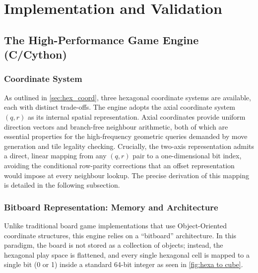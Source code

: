 \chapter{Implementation and Validation}
\label{chapter3}
\section{The High-Performance Game Engine (C/Cython)} \label{bitboard}

\subsection{Coordinate System}\label{sec:coord_system}

As outlined in \cref{sec:hex_coord}, three hexagonal coordinate systems are available, each with distinct trade-offs. The engine adopts the axial coordinate system $(q, r)$ as its internal spatial representation. Axial coordinates provide uniform direction vectors and branch-free neighbour arithmetic, both of which are essential properties for the high-frequency geometric queries demanded by move generation and tile legality checking. Crucially, the two-axis representation admits a direct, linear mapping from any $(q, r)$ pair to a one-dimensional bit index, avoiding the conditional row-parity corrections that an offset representation would impose at every neighbour lookup. The precise derivation of this mapping is detailed in the following subsection.

\subsection{Bitboard Representation: Memory and Architecture}
Unlike traditional board game implementations that use Object-Oriented coordinate structures, this engine relies on a ``bitboard'' architecture. In this paradigm, the board is not stored as a collection of objects; instead, the hexagonal play space is flattened, and every single hexagonal cell is mapped to a single bit (0 or 1) inside a standard 64-bit integer as seen in \cref{fig:hexa to cube}.

